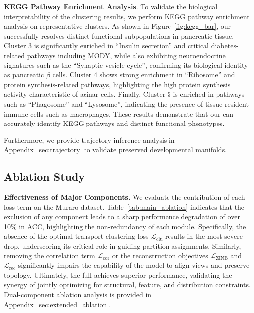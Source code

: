 \smallskip\noindent\textbf{KEGG Pathway Enrichment Analysis}. To validate the biological interpretability of the clustering results, we perform KEGG pathway enrichment analysis on representative clusters. As shown in Figure~\ref{fig:kegg_bar}, our \method{} successfully resolves distinct functional subpopulations in pancreatic tissue. Cluster 3 is significantly enriched in ``Insulin secretion'' and critical diabetes-related pathways including MODY, while also exhibiting neuroendocrine signatures such as the ``Synaptic vesicle cycle'', confirming its biological identity as pancreatic $\beta$ cells. Cluster 4 shows strong enrichment in ``Ribosome'' and protein synthesis-related pathways, highlighting the high protein synthesis activity characteristic of acinar cells. Finally, Cluster 5 is enriched in pathways such as ``Phagosome'' and ``Lysosome'', indicating the presence of tissue-resident immune cells such as macrophages. These results demonstrate that our \method{} can accurately identify KEGG pathways and distinct functional phenotypes.

Furthermore, we provide trajectory inference analysis in Appendix~\ref{sec:trajectory} to validate preserved developmental manifolds.



\subsection{Ablation Study}

\smallskip\noindent\textbf{Effectiveness of Major Components.}
We evaluate the contribution of each loss term on the Muraro dataset. Table~\ref{tab:main_ablation} indicates that the exclusion of any component leads to a sharp performance degradation of over 10\% in ACC, highlighting the non-redundancy of each module. Specifically, the absence of the optimal transport clustering loss $\mathcal{L}_{\text{clu}}$ results in the most severe drop, underscoring its critical role in guiding partition assignments. Similarly, removing the correlation term $\mathcal{L}_{\text{cor}}$ or the reconstruction objectives $\mathcal{L}_{\text{ZINB}}$ and $\mathcal{L}_{\text{rec}}$ significantly impairs the capability of the model to align views and preserve topology. Ultimately, the full \method{} achieves superior performance, validating the synergy of jointly optimizing for structural, feature, and distribution constraints. Dual-component ablation analysis is provided in Appendix~\ref{sec:extended_ablation}.


